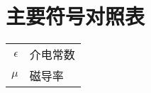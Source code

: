 \chapter{主要符号对照表}
\label{chap:symb}

\begin{longtable}{rl}
 $\epsilon$     & 介电常数 \\
 $\mu$ 		& 磁导率 \\

\end{longtable}
